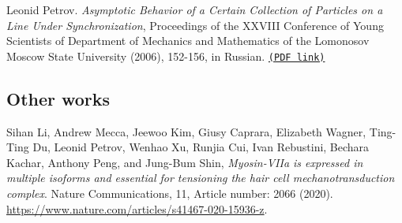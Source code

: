 \begin{etaremune}
\item 
Leonid Petrov.
\emph{Asymptotic Behavior of a Certain Collection of Particles on a Line Under Synchronization}, Proceedings of the XXVIII Conference of Young Scientists of Department of Mechanics and Mathematics of the Lomonosov Moscow State University (2006), 152-156, in Russian. 
 \href{https://storage.lpetrov.cc/research_files/Petrov-publ/Asymptotic_Behavior.pdf}{\texttt{(PDF link)}}


\end{etaremune}

\subsection*{Other works}

\begin{etaremune}
	\renewcommand{\labelenumi}{[\theenumi]}
	\item
	Sihan Li, Andrew Mecca, Jeewoo Kim, Giusy Caprara, Elizabeth Wagner, Ting-Ting Du, Leonid Petrov, Wenhao Xu, Runjia Cui, Ivan Rebustini, Bechara Kachar, Anthony Peng, and Jung-Bum Shin,
	\emph{Myosin-VIIa is expressed in multiple isoforms and essential for tensioning the hair cell mechanotransduction complex}.
	Nature Communications, 11, Article number: 2066 (2020). \url{https://www.nature.com/articles/s41467-020-15936-z}.
\end{etaremune}

